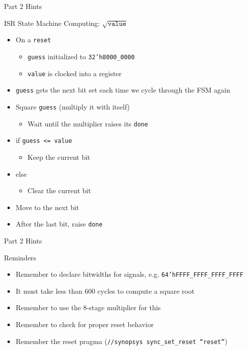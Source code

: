 \documentclass[dvipsnames]{beamer}
\begin{document}
\begin{frame}{Part 2 Hints}
	\begin{block}{ISR State Machine}
		Computing: $\sqrt{\mathtt{value}}$
		\begin{itemize}
			\item On a \texttt{reset}
				\begin{itemize}
					\item \texttt{guess} initialized to \texttt{32'h8000\_0000}	
					\item \texttt{value} is clocked into a register
				\end{itemize}
			\item \texttt{guess} gets the next bit set each time we cycle
				through the FSM again
			\item Square \texttt{guess} (multiply it with itself)
				\begin{itemize}
					\item Wait until the multiplier raises its \texttt{done}
				\end{itemize}
			\item if \texttt{guess <= value} 
				\begin{itemize}
					\item Keep the current bit
				\end{itemize}
			\item else 
				\begin{itemize}
					\item Clear the current bit
				\end{itemize}
			\item Move to the next bit
			\item After the last bit, raise \texttt{done}
		\end{itemize}
	\end{block}
\end{frame}

\begin{frame}{Part 2 Hints}
	\begin{block}{Reminders}
		\begin{itemize}
			\item Remember to declare bitwidths for signals, e.g.
				\texttt{64'hFFFF\_FFFF\_FFFF\_FFFF}
			\item It must take less than 600 cycles to compute a square root
			\item Remember to use the 8-stage multiplier for this
			\item Remember to check for proper reset behavior
			\item Remember the reset pragma (\texttt{//synopsys sync\_set\_reset
				``reset''})
		\end{itemize}
	\end{block}
\end{frame}
\end{document}
